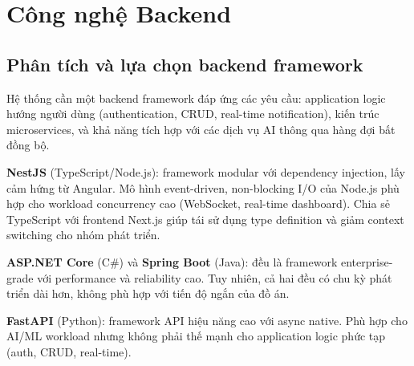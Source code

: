 \section{Công nghệ Backend}
\subsection{Phân tích và lựa chọn backend framework}

Hệ thống cần một backend framework đáp ứng các yêu cầu: application logic hướng người dùng (authentication, CRUD, real-time notification), kiến trúc microservices, và khả năng tích hợp với các dịch vụ AI thông qua hàng đợi bất đồng bộ.

\textbf{NestJS} (TypeScript/Node.js): framework modular với dependency injection, lấy cảm hứng từ Angular. Mô hình event-driven, non-blocking I/O của Node.js phù hợp cho workload concurrency cao (WebSocket, real-time dashboard). Chia sẻ TypeScript với frontend Next.js giúp tái sử dụng type definition và giảm context switching cho nhóm phát triển. \cite{nestjs}

\textbf{ASP.NET Core} (C\#) và \textbf{Spring Boot} (Java): đều là framework enterprise-grade với performance và reliability cao. Tuy nhiên, cả hai đều có chu kỳ phát triển dài hơn, không phù hợp với tiến độ ngắn của đồ án. \cite{aspnet, springboot}

\textbf{FastAPI} (Python): framework API hiệu năng cao với async native. Phù hợp cho AI/ML workload nhưng không phải thế mạnh cho application logic phức tạp (auth, CRUD, real-time). \cite{fastapi}

\begin{table}[H]
    \centering
    \caption{So sánh backend framework theo yêu cầu dự án}
    \label{tab:framework_comparison}
    \scriptsize
\end{table}

